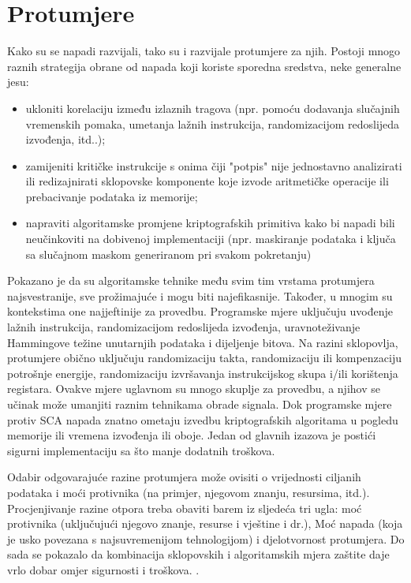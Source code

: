 \documentclass[times, utf8, diplomski]{fer}
\begin{document}
\section{Protumjere}

Kako su se napadi razvijali, tako su i razvijale protumjere za njih. Postoji mnogo raznih strategija obrane od napada koji koriste sporedna sredstva, neke generalne jesu:
\begin{itemize}
    \item ukloniti korelaciju između izlaznih tragova (npr. pomoću dodavanja slučajnih vremenskih pomaka, umetanja lažnih instrukcija, randomizacijom redoslijeda izvođenja, itd..);
    \item zamijeniti kritičke instrukcije s onima čiji "potpis" nije jednostavno analizirati ili redizajnirati sklopovske komponente koje izvode aritmetičke operacije ili prebacivanje podataka iz memorije;
    \item napraviti algoritamske promjene kriptografskih primitiva kako bi napadi bili neučinkoviti na dobivenoj implementaciji (npr. maskiranje podataka i ključa sa slučajnom maskom generiranom pri svakom pokretanju)
\end{itemize}

Pokazano je da su algoritamske tehnike među svim tim vrstama protumjera najsvestranije, sve prožimajuće i mogu biti najefikasnije. Također, u mnogim su kontekstima one najjeftinije za provedbu. Programske mjere uključuju uvođenje lažnih instrukcija, randomizacijom redoslijeda izvođenja, uravnoteživanje Hammingove težine unutarnjih podataka i dijeljenje bitova. Na razini sklopovlja, protumjere obično uključuju randomizaciju takta, randomizaciju ili kompenzaciju potrošnje energije, randomizaciju izvršavanja instrukcijskog skupa i/ili korištenja registara. Ovakve mjere uglavnom su mnogo skuplje za provedbu, a njihov se učinak može umanjiti raznim tehnikama obrade signala. Dok programske mjere protiv SCA napada znatno ometaju izvedbu kriptografskih algoritama u pogledu memorije ili vremena izvođenja ili oboje. Jedan od glavnih izazova je postići sigurni implementaciju sa što manje dodatnih troškova.

Odabir odgovarajuće razine protumjera može ovisiti o vrijednosti ciljanih podataka i moći protivnika (na primjer, njegovom znanju, resursima, itd.). Procjenjivanje razine otpora treba obaviti barem iz sljedeća tri ugla: moć protivnika (uključujući njegovo znanje, resurse i vještine i dr.), Moć napada (koja je usko povezana s najsuvremenijom tehnologijom) i djelotvornost protumjera. Do sada se pokazalo da kombinacija sklopovskih i algoritamskih mjera zaštite daje vrlo dobar omjer sigurnosti i troškova. \citep{zhou2005side}.
\end{document}
